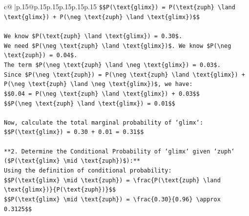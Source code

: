 \documentclass{article}
\begin{document}
{\begin{supertabular}{c@{$\;$}|p{.15\linewidth}@{}p{.15\linewidth}p{.15\linewidth}p{.15\linewidth}p{.15\linewidth}p{.15\linewidth}}
{{{\texttt{\$\$P(\textbackslash{}text\{glimx\}) = P(\textbackslash{}text\{zuph\} \textbackslash{}land \textbackslash{}text\{glimx\}) + P(\textbackslash{}neg \textbackslash{}text\{zuph\} \textbackslash{}land \textbackslash{}text\{glimx\})\$\$} \\
\\ 
\texttt{We know \$P(\textbackslash{}text\{zuph\} \textbackslash{}land \textbackslash{}text\{glimx\}) = 0.30\$.} \\
\texttt{We need \$P(\textbackslash{}neg \textbackslash{}text\{zuph\} \textbackslash{}land \textbackslash{}text\{glimx\})\$. We know \$P(\textbackslash{}neg \textbackslash{}text\{zuph\}) = 0.04\$.} \\
\texttt{The term \$P(\textbackslash{}neg \textbackslash{}text\{zuph\} \textbackslash{}land \textbackslash{}neg \textbackslash{}text\{glimx\}) = 0.03\$.} \\
\texttt{Since \$P(\textbackslash{}neg \textbackslash{}text\{zuph\}) = P(\textbackslash{}neg \textbackslash{}text\{zuph\} \textbackslash{}land \textbackslash{}text\{glimx\}) + P(\textbackslash{}neg \textbackslash{}text\{zuph\} \textbackslash{}land \textbackslash{}neg \textbackslash{}text\{glimx\})\$, we have:} \\
\texttt{\$\$0.04 = P(\textbackslash{}neg \textbackslash{}text\{zuph\} \textbackslash{}land \textbackslash{}text\{glimx\}) + 0.03\$\$} \\
\texttt{\$\$P(\textbackslash{}neg \textbackslash{}text\{zuph\} \textbackslash{}land \textbackslash{}text\{glimx\}) = 0.01\$\$} \\
\\ 
\texttt{Now, calculate the total marginal probability of `glimx`:} \\
\texttt{\$\$P(\textbackslash{}text\{glimx\}) = 0.30 + 0.01 = 0.31\$\$} \\
\\ 
\texttt{**2. Determine the Conditional Probability of `glimx` given `zuph` (\$P(\textbackslash{}text\{glimx\} \textbackslash{}mid \textbackslash{}text\{zuph\})\$):**} \\
\texttt{Using the definition of conditional probability:} \\
\texttt{\$\$P(\textbackslash{}text\{glimx\} \textbackslash{}mid \textbackslash{}text\{zuph\}) = \textbackslash{}frac\{P(\textbackslash{}text\{zuph\} \textbackslash{}land \textbackslash{}text\{glimx\})\}\{P(\textbackslash{}text\{zuph\})\}\$\$} \\
\texttt{\$\$P(\textbackslash{}text\{glimx\} \textbackslash{}mid \textbackslash{}text\{zuph\}) = \textbackslash{}frac\{0.30\}\{0.96\} \textbackslash{}approx 0.3125\$\$} \\
}}}
\end{supertabular}}
\end{document}
